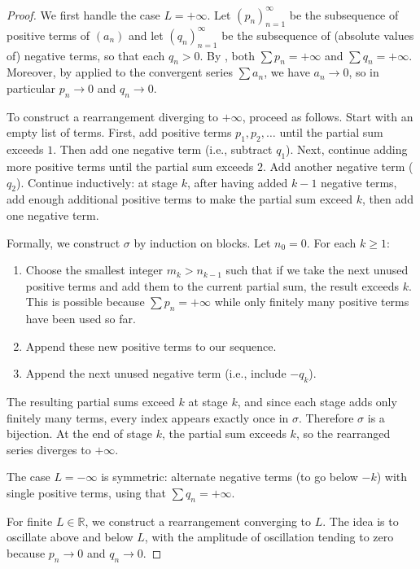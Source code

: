 \begin{proof}
    We first handle the case $L = +\infty$. Let $(p_n)_{n=1}^\infty$ be the subsequence of positive terms of $(a_n)$ and let $(q_n)_{n=1}^\infty$ be the subsequence of (absolute values of) negative terms, so that each $q_n > 0$. By , both $\sum p_n = +\infty$ and $\sum q_n = +\infty$. Moreover, by  applied to the convergent series $\sum a_n$, we have $a_n \to 0$, so in particular $p_n \to 0$ and $q_n \to 0$.

    To construct a rearrangement diverging to $+\infty$, proceed as follows. Start with an empty list of terms. First, add positive terms $p_1, p_2, \dots$ until the partial sum exceeds $1$. Then add one negative term (i.e., subtract $q_1$). Next, continue adding more positive terms until the partial sum exceeds $2$. Add another negative term ($q_2$). Continue inductively: at stage $k$, after having added $k-1$ negative terms, add enough additional positive terms to make the partial sum exceed $k$, then add one negative term.

    Formally, we construct $\sigma$ by induction on blocks. Let $n_0 = 0$. For each $k \geq 1$:
    \begin{enumerate}
        \item Choose the smallest integer $m_k > n_{k-1}$ such that if we take the next unused positive terms and add them to the current partial sum, the result exceeds $k$. This is possible because $\sum p_n = +\infty$ while only finitely many positive terms have been used so far.
        \item Append these new positive terms to our sequence.
        \item Append the next unused negative term (i.e., include $-q_k$).
    \end{enumerate}

    The resulting partial sums exceed $k$ at stage $k$, and since each stage adds only finitely many terms, every index appears exactly once in $\sigma$. Therefore $\sigma$ is a bijection. At the end of stage $k$, the partial sum exceeds $k$, so the rearranged series diverges to $+\infty$.

    The case $L = -\infty$ is symmetric: alternate negative terms (to go below $-k$) with single positive terms, using that $\sum q_n = +\infty$.

    For finite $L \in \mathbb{R}$, we construct a rearrangement converging to $L$. The idea is to oscillate above and below $L$, with the amplitude of oscillation tending to zero because $p_n \to 0$ and $q_n \to 0$.


\end{proof}
